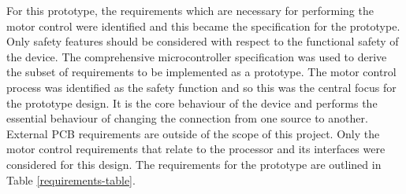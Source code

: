 
For this prototype, the requirements which are necessary for performing the motor control were identified and this became the specification for the prototype.
Only safety features should be considered with respect to the functional safety of the device\cite{HayekSRAM}.
The comprehensive microcontroller specification was used to derive the subset of requirements to be implemented as a prototype. The motor control process was identified as the safety function and so this was the central focus for the prototype design. It is the core behaviour of the device and performs the essential behaviour of changing the connection from one source to another. External PCB requirements are outside of the scope of this project. Only the motor control requirements that relate to the processor and its interfaces were considered for this design. The requirements for the prototype are outlined in Table \ref{requirements-table}.



